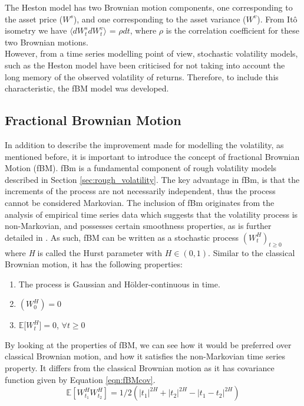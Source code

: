\documentclass[12pt,oneside]{article}
\begin{document}
The Heston model has two Brownian motion components, one corresponding to the asset price ($W^s$), and one corresponding to the asset variance ($W^v$). From It\^o isometry we have $\langle  dW_t^{s} dW_t^{v}\rangle$ = $\rho dt$, where $\rho$ is the correlation coefficient for these two Brownian motions.
\\

However, from a time series modelling point of view, stochastic volatility models, such as the Heston model have been criticised for not taking into account the long memory of the observed volatility of returns. Therefore, to include this characteristic, the fBM model was developed. 

\subsection{Fractional Brownian Motion}
\label{sec:fractionalBm}
In addition to describe the improvement made for modelling the volatility, as mentioned before, it is important to introduce the concept of fractional Brownian Motion (fBM). fBm is a fundamental component of rough volatility models described in Section \ref{sec:rough_volatility}. The key  advantage in fBm, is that the increments of the process are not necessarily independent, thus the process cannot be considered Markovian. The inclusion of fBm originates from the analysis of empirical time series data which suggests that the volatility process is non-Markovian, and possesses certain smoothness properties, as is further detailed in \cite{Gatheral2014}. As such, fBM can be written as a stochastic process $(W^H_t)_{t\ge0}$ where \textit{H} is called the Hurst parameter with $\textit{H} \in (0,1)$. Similar to the classical Brownian motion, it has the following properties: 
\begin{enumerate} 
\item The process is Gaussian and H\"{o}lder-continuous in time. 
\item $(\textit{$W^H_0$})=0$  
\item $\mathbb{E}$[\textit{$W^H_t$}]$=0$,
$\forall t \ge 0$ 
\end{enumerate}

 By looking at the properties of fBM, we can see how it would be preferred over classical Brownian motion, and how it satisfies the non-Markovian time series property. It differs from the classical Brownian motion as it has covariance function given by Equation \ref{eqn:fBMcov}.
\begin{equation}
\label{eqn:fBMcov}
\mathbb{E}[W^H_{t_1}W^H_{t_2}]=1/2(|t_1|^{2H}+|t_2|^{2H}-|t_1-t_2|^{2H})
\end{equation}
\end{document}
